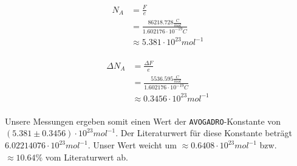 \documentclass[10pt,a4paper]{article}
\begin{document}
\begin{figure}[h]
\centering
\begin{subfigure}[c]{0.5\textwidth}
\begin{align*}
N_A &= \frac{F}{e} \\
&= \frac{86218.728 \frac{C}{mol}}{1.602176 \cdot 10^{-19} C} \\
&\approx 5.381 \cdot 10^{23} mol^{-1} \\
\end{align*}
\end{subfigure}%
\begin{subfigure}[c]{0.5\textwidth}
\begin{align*}
\Delta N_A &= \frac{\Delta F}{e} \\
&= \frac{5536.595 \frac{C}{mol}}{1.602176 \cdot 10^{-19} C} \\
&\approx 0.3456 \cdot 10^{23} mol^{-1} \\
\end{align*}
\end{subfigure}%
\end{figure}

\begin{flushleft}
Unsere Messungen ergeben somit einen Wert der \texttt{AVOGADRO}-Konstante von $(5.381 \pm 0.3456) \cdot 10^{23} mol^{-1}$. Der Literaturwert \cite{Avocado} für diese Konstante beträgt $6.02214076 \cdot 10^{23} mol^{-1}$. Unser Wert weicht um $\approx 0.6408 \cdot 10^{23} mol^{-1}$ bzw. $\approx 10.64\%$ vom Literaturwert ab.
\end{flushleft}
\end{document}
